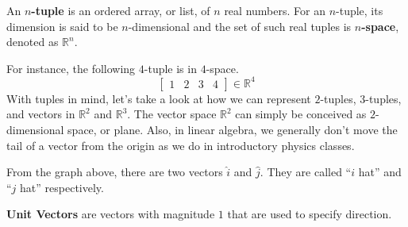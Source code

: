 \documentclass[../../main.tex]{subfiles}
\begin{document}
\begin{definition}{}{}
An \textbf{$n$-tuple} is an ordered array, or list, of $n$ real
numbers. For an $n$-tuple, its dimension is said to be $n$-dimensional
and the set of such real tuples is \textbf{$n$-space}, denoted as
$\mathbb{R}^n$.
\end{definition}

For instance, the following $4$-tuple is in $4$-space.
\[
\begin{bmatrix}
    1 & 2 & 3 & 4
\end{bmatrix}
\in
\mathbb{R}^4
\]
With tuples in mind, let's take a look at how we can represent
$2$-tuples, $3$-tuples, and vectors in $\mathbb{R}^2$ and
$\mathbb{R}^3$. The vector space $\mathbb{R}^2$ can simply be
conceived as $2$-dimensional space, or plane. Also, in linear
algebra, we generally don't move the tail of a vector from the origin
as we do in introductory physics classes.

\begin{figure}[H]
\centering
{}
\end{figure}

From the graph above, there are two vectors $\hat{i}$ and $\hat{j}$.
They are called ``$i$ hat'' and ``$j$ hat'' respectively.

\begin{definition}{}{}
\textbf{Unit Vectors} are vectors with magnitude $1$ that are used to
specify direction.
\end{definition}
\end{document}

